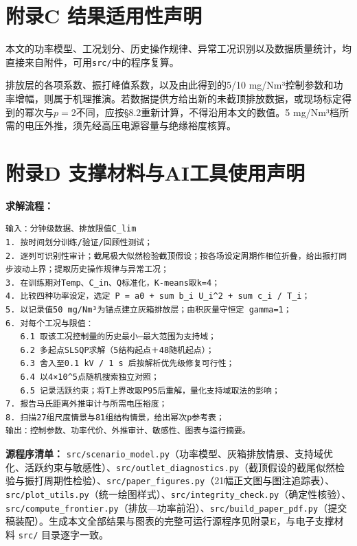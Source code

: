 \documentclass[UTF8,zihao=5,a4paper]{ctexart}
\begin{document}
\section*{附录C 结果适用性声明}

本文的功率模型、工况划分、历史操作规律、异常工况识别以及数据质量统计，均直接来自附件，可用\texttt{src/}中的程序复算。

排放层的各项系数、振打峰值系数，以及由此得到的5/10 mg/Nm³控制参数和功率增幅，则属于机理推演。若数据提供方给出新的未截顶排放数据，或现场标定得到的幂次与$p=2$不同，应按§8.2重新计算，不得沿用本文的数值。5 mg/Nm³档所需的电压外推，须先经高压电源容量与绝缘裕度核算。

\section*{附录D 支撑材料与AI工具使用声明}

\textbf{求解流程：}

\begin{lstlisting}[style=pseudo]
输入：分钟级数据、排放限值C_lim
1. 按时间划分训练/验证/回顾性测试；
2. 逐列可识别性审计；截尾极大似然检验截顶假设；按各场设定周期作相位折叠，给出振打同步波动上界；提取历史操作规律与异常工况；
3. 在训练期对Temp、C_in、Q标准化，K-means取k=4；
4. 比较四种功率设定，选定 P = a0 + sum b_i U_i^2 + sum c_i / T_i；
5. 以记录值50 mg/Nm³为锚点建立灰箱排放层；由积灰量守恒定 gamma=1；
6. 对每个工况与限值：
   6.1 取该工况控制量的历史最小—最大范围为支持域；
   6.2 多起点SLSQP求解（5结构起点＋48随机起点）；
   6.3 舍入至0.1 kV / 1 s 后按解析优先级修复可行性；
   6.4 以4×10^5点随机搜索独立对照；
   6.5 记录活跃约束；将T上界改取P95后重解，量化支持域取法的影响；
7. 报告马氏距离外推审计与所需电压裕度；
8. 扫描27组尺度情景与81组结构情景，给出幂次p参考表；
输出：控制参数、功率代价、外推审计、敏感性、图表与运行摘要。
\end{lstlisting}

\textbf{源程序清单：} \texttt{src/scenario\_model.py}（功率模型、灰箱排放情景、支持域优化、活跃约束与敏感性）、\texttt{src/outlet\_diagnostics.py}（截顶假设的截尾似然检验与振打周期性检验）、\texttt{src/paper\_figures.py}（21幅正文图与图注追踪表）、\texttt{src/plot\_utils.py}（统一绘图样式）、\texttt{src/integrity\_check.py}（确定性核验）、\texttt{src/compute\_frontier.py}（排放—功率前沿）、\texttt{src/build\_paper\_pdf.py}（提交稿装配）。生成本文全部结果与图表的完整可运行源程序见附录E，与电子支撑材料 \texttt{src/} 目录逐字一致。
\end{document}
